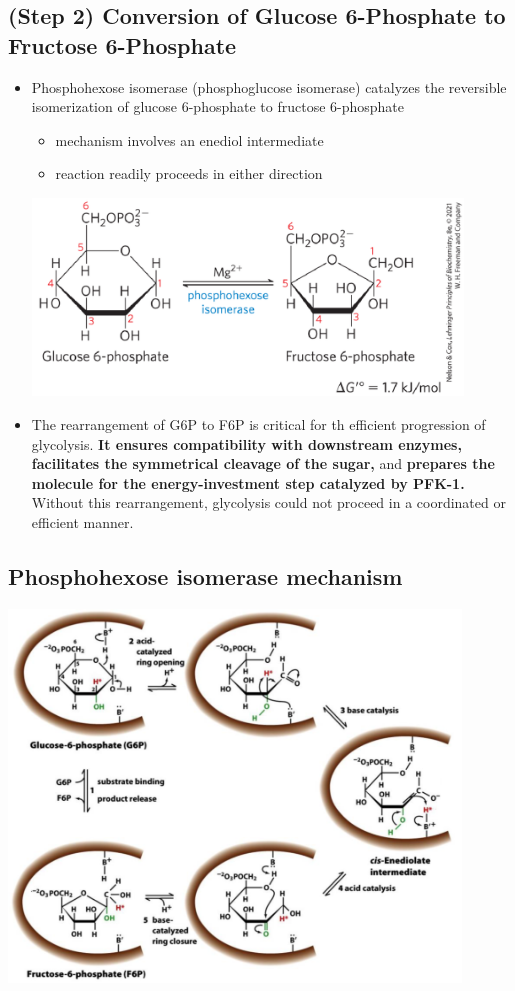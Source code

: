\documentclass[10pt]{article}
\begin{document}
\subsection*{(Step 2) Conversion of Glucose 6-Phosphate to Fructose 6-Phosphate}
\begin{itemize}
	\item Phosphohexose isomerase (phosphoglucose isomerase) catalyzes the reversible isomerization of glucose 6-phosphate to fructose 6-phosphate
	\begin{itemize}
        \item mechanism involves an enediol intermediate
        \item reaction readily proceeds in either direction
    \end{itemize}
    \begin{center} 
        \includegraphics*[width=0.9\textwidth]{L1_4.png}
    \end{center}
    \item The rearrangement of G6P to F6P is critical for th efficient progression of glycolysis.  \textbf{It ensures compatibility with downstream enzymes, facilitates the symmetrical cleavage of the sugar,} and \textbf{prepares the molecule for the energy-investment step catalyzed by PFK-1.}  Without this rearrangement, glycolysis could not proceed in a coordinated or efficient manner.
\end{itemize}

\subsection*{Phosphohexose isomerase mechanism}
\begin{center} 
	\includegraphics*[width=0.9\textwidth]{L1_5.png}
\end{center}
\end{document}
